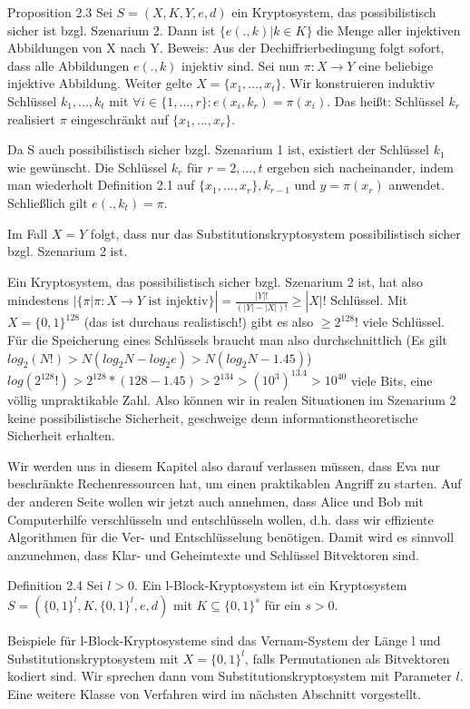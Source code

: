 \documentclass[a4paper]{article}
\begin{document}
\begin{multicols}{3}
    Proposition 2.3 Sei $S=(X,K,Y,e,d)$ ein Kryptosystem, das possibilistisch sicher ist bzgl. Szenarium 2. Dann ist $\{e(.,k)|k\in K\}$ die Menge aller injektiven Abbildungen von X nach Y.
    Beweis: Aus der Dechiffrierbedingung folgt sofort, dass alle Abbildungen $e(.,k)$ injektiv sind.
    Sei nun $\pi:X\rightarrow Y$ eine beliebige injektive Abbildung. Weiter gelte $X=\{x_1,...,x_t\}$. Wir konstruieren induktiv Schlüssel $k_1,...,k_t$ mit $\forall i\in\{1,...,r\}:e(x_i,k_r)=\pi(x_i)$.
    Das heißt: Schlüssel $k_r$ realisiert $\pi$ eingeschränkt auf $\{x_1,...,x_r\}$.

    Da S auch possibilistisch sicher bzgl. Szenarium 1 ist, existiert der Schlüssel $k_1$ wie gewünscht. Die Schlüssel $k_r$ für $r=2,...,t$ ergeben sich nacheinander, indem man wiederholt Definition 2.1 auf $\{x_1,...,x_r\},k_{r-1}$ und $y=\pi(x_r)$ anwendet. Schließlich gilt $e(.,k_t)=\pi$.

    Im Fall $X=Y$ folgt, dass nur das Substitutionskryptosystem possibilistisch sicher bzgl. Szenarium 2 ist.

    Ein Kryptosystem, das possibilistisch sicher bzgl. Szenarium 2 ist, hat also mindestens $|\{\pi |\pi :X\rightarrow Y\text{ ist injektiv}\}|=\frac{|Y|!}{(|Y|-|X|)!} \geq |X|!$ Schlüssel. Mit $X=\{0,1\}^{128}$ (das ist durchaus realistisch!) gibt es also $\geq 2^{128}!$ viele Schlüssel. Für die Speicherung eines Schlüssels braucht man also durchschnittlich (Es gilt $log_2(N!)>N(log_2 N-log_2 e)> N(log_2 N- 1.45)$) $log(2^{128}!)> 2^{128}*(128- 1.45)> 2^{134}>(10^3 )^{13.4} > 10^{40}$ viele Bits, eine völlig unpraktikable Zahl.
    Also können wir in realen Situationen im Szenarium 2 keine possibilistische Sicherheit, geschweige denn informationstheoretische Sicherheit erhalten.

    Wir werden uns in diesem Kapitel also darauf verlassen müssen, dass Eva nur beschränkte Rechenressourcen hat, um einen praktikablen Angriff zu starten. Auf der anderen Seite wollen wir jetzt auch annehmen, dass Alice und Bob mit Computerhilfe verschlüsseln und entschlüsseln wollen, d.h. dass wir effiziente Algorithmen für die Ver- und Entschlüsselung benötigen. Damit wird es sinnvoll anzunehmen, dass Klar- und Geheimtexte und Schlüssel Bitvektoren sind.

    Definition 2.4 Sei $l>0$. Ein l-Block-Kryptosystem ist ein Kryptosystem $S=(\{0,1\}^l,K,\{0,1\}^l,e,d)$ mit $K\subseteq \{0,1\}^s$ für ein $s>0$.

    Beispiele für l-Block-Kryptosysteme sind das Vernam-System der Länge l und Substitutionskryptosystem mit $X=\{0,1\}^l$, falls Permutationen als Bitvektoren kodiert sind. Wir sprechen dann vom Substitutionskryptosystem mit Parameter $l$.
    Eine weitere Klasse von Verfahren wird im nächsten Abschnitt vorgestellt.


\end{multicols}
\end{document}
